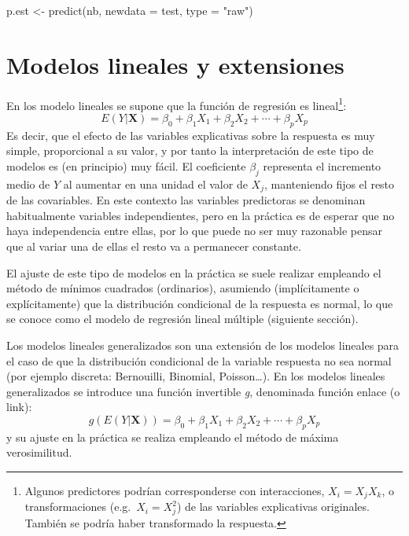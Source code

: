 \documentclass[
  spanish,
]{book}
\newenvironment{Shaded}{\begin{snugshade}}{\end{snugshade}}
\newcommand{\AttributeTok}[1]{\textcolor[rgb]{0.77,0.63,0.00}{#1}}
\newcommand{\FunctionTok}[1]{\textcolor[rgb]{0.00,0.00,0.00}{#1}}
\newcommand{\NormalTok}[1]{#1}
\newcommand{\OtherTok}[1]{\textcolor[rgb]{0.56,0.35,0.01}{#1}}
\newcommand{\StringTok}[1]{\textcolor[rgb]{0.31,0.60,0.02}{#1}}
\theoremstyle{break}
\theoremstyle{definition}
\theoremstyle{definition}
\theoremstyle{definition}
\theoremstyle{definition}
\theoremstyle{remark}
\begin{document}
\begin{Shaded}
\begin{Highlighting}[]
\NormalTok{p.est }\OtherTok{\textless{}{-}} \FunctionTok{predict}\NormalTok{(nb, }\AttributeTok{newdata =}\NormalTok{ test, }\AttributeTok{type =} \StringTok{"raw"}\NormalTok{)}
\end{Highlighting}
\end{Shaded}

\hypertarget{modelos-lineales}{%
\chapter{Modelos lineales y extensiones}\label{modelos-lineales}}

En los modelo lineales se supone que la función de regresión es lineal\footnote{Algunos predictores podrían corresponderse con interacciones, \(X_i = X_j X_k\), o transformaciones (e.g.~\(X_i = X_j^2\)) de las variables explicativas originales. También se podría haber transformado la respuesta.}:
\[E( Y | \mathbf{X} ) = \beta_{0}+\beta_{1}X_{1}+\beta_{2}X_{2}+\cdots+\beta_{p}X_{p}\]
Es decir, que el efecto de las variables explicativas sobre la respuesta es muy simple, proporcional a su valor, y por tanto la interpretación de este tipo de modelos es (en principio) muy fácil.
El coeficiente \(\beta_j\) representa el incremento medio de \(Y\) al aumentar en una unidad el valor de \(X_j\), manteniendo fijos el resto de las covariables.
En este contexto las variables predictoras se denominan habitualmente variables independientes, pero en la práctica es de esperar que no haya independencia entre ellas, por lo que puede no ser muy razonable pensar que al variar una de ellas el resto va a permanecer constante.

El ajuste de este tipo de modelos en la práctica se suele realizar empleando el método de mínimos cuadrados (ordinarios), asumiendo (implícitamente o explícitamente) que la distribución condicional de la respuesta es normal, lo que se conoce como el modelo de regresión lineal múltiple (siguiente sección).

Los modelos lineales generalizados son una extensión de los modelos lineales para el caso de que la distribución condicional de la variable respuesta no sea normal (por ejemplo discreta: Bernouilli, Binomial, Poisson\ldots).
En los modelos lineales generalizados se introduce una función invertible \emph{g}, denominada función enlace (o link):
\[g\left(E(Y | \mathbf{X} )\right) = \beta_{0}+\beta_{1}X_{1}+\beta_{2}X_{2}+\cdots+\beta_{p}X_{p}\]
y su ajuste en la práctica se realiza empleando el método de máxima verosimilitud.
\end{document}
